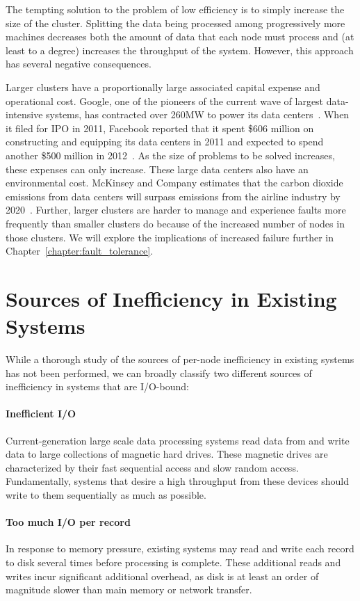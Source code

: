 The tempting solution to the problem of low efficiency is to simply increase
the size of the cluster. Splitting the data being processed among progressively
more machines decreases both the amount of data that each node must process and
(at least to a degree) increases the throughput of the system. However, this
approach has several negative consequences.

Larger clusters have a proportionally large associated capital expense and
operational cost. Google, one of the pioneers of the current wave of largest
data-intensive systems, has contracted over 260MW to power its data
centers~\cite{google-dc-power-blog}. When it filed for IPO in 2011, Facebook
reported that it spent \$606 million on constructing and equipping its data
centers in 2011 and expected to spend another \$500 million in
2012~\cite{facebook-ipo}. As the size of problems to be solved increases, these
expenses can only increase. These large data centers also have an environmental
cost. McKinsey and Company estimates that the carbon dioxide emissions from
data centers will surpass emissions from the airline industry by
2020~\cite{mckinsey-co2-study}.  Further, larger clusters are harder to manage
and experience faults more frequently than smaller clusters do because of the
increased number of nodes in those clusters. We will explore the implications
of increased failure further in Chapter~\ref{chapter:fault_tolerance}.

\section{Sources of Inefficiency in Existing Systems}

While a thorough study of the sources of per-node inefficiency in existing
systems has not been performed, we can broadly classify two different sources
of inefficiency in systems that are I/O-bound:

\paragraph{Inefficient I/O} Current-generation large scale data processing
systems read data from and write data to large collections of magnetic hard
drives. These magnetic drives are characterized by their fast sequential access
and slow random access. Fundamentally, systems that desire a high throughput
from these devices should write to them sequentially as much as possible.

\paragraph{Too much I/O per record} In response to memory pressure, existing
systems may read and write each record to disk several times before processing
is complete. These additional reads and writes incur significant additional
overhead, as disk is at least an order of magnitude slower than main memory or
network transfer.

